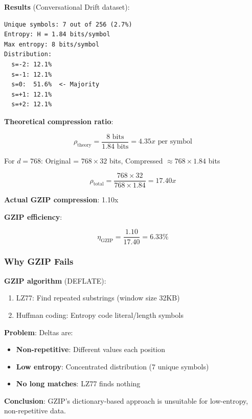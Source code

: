 \documentclass[11pt,a4paper]{article}
\begin{document}
\textbf{Results} (Conversational Drift dataset):

\begin{verbatim}
Unique symbols: 7 out of 256 (2.7%)
Entropy: H = 1.84 bits/symbol
Max entropy: 8 bits/symbol
Distribution:
  s=-2: 12.1%
  s=-1: 12.1%
  s=0:  51.6%  <- Majority
  s=+1: 12.1%
  s=+2: 12.1%
\end{verbatim}

\textbf{Theoretical compression ratio}:

\begin{equation}
\rho_{\text{theory}} = \frac{8 \text{ bits}}{1.84 \text{ bits}} = 4.35x \text{ per symbol}
\end{equation}

For $d = 768$: Original = $768 \times 32$ bits, Compressed $\approx 768 \times 1.84$ bits

\begin{equation}
\rho_{\text{total}} = \frac{768 \times 32}{768 \times 1.84} = 17.40x
\end{equation}

\textbf{Actual GZIP compression}: 1.10x

\textbf{GZIP efficiency}:

\begin{equation}
\eta_{\text{GZIP}} = \frac{1.10}{17.40} = 6.33\%
\end{equation}

\subsubsection{Why GZIP Fails}

\textbf{GZIP algorithm} (DEFLATE):
\begin{enumerate}
\item LZ77: Find repeated substrings (window size 32KB)
\item Huffman coding: Entropy code literal/length symbols
\end{enumerate}

\textbf{Problem}: Deltas are:
\begin{itemize}
\item \textbf{Non-repetitive}: Different values each position
\item \textbf{Low entropy}: Concentrated distribution (7 unique symbols)
\item \textbf{No long matches}: LZ77 finds nothing
\end{itemize}

\textbf{Conclusion}: GZIP's dictionary-based approach is unsuitable for low-entropy, non-repetitive data.
\end{document}
